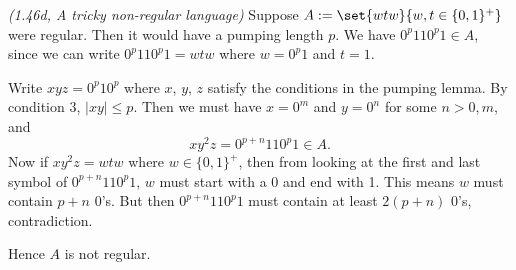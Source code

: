 \begin{problem}{\it(1.46d, A tricky non-regular language)}
%
Suppose $A:=\set{wtw}{w,t\in\{0,1\}^+}$ were regular. Then it would have a pumping length $p$. We have $0^p110^p1\in A$, since we can write $0^p110^p1=wtw$ where $w=0^p1$ and $t=1$.

Write $xyz=0^p10^p$ where $x$, $y$, $z$ satisfy the conditions in the pumping lemma. By condition 3, $|xy|\le p$. Then we must have $x=0^m$ and $y=0^n$ for some $n>0, m$, and
\[
xy^2z=0^{p+n}110^p1\in A.
\]
Now if $xy^2z=wtw$ where $w\in \{0,1\}^+$, then from looking at the first and last symbol of $0^{p+n}110^p1$, $w$ must start with a 0 and end with 1. This means $w$ must contain $p+n$ 0's. But then $0^{p+n}110^p1$ must contain at least $2(p+n)$ 0's, contradiction.

Hence $A$ is not regular.
%
\end{problem}

\pagebreak

